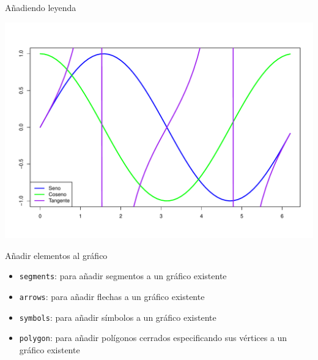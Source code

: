 \documentclass[
  ignorenonframetext,
  aspectratio=169]{beamer}
\providecommand{\tightlist}{%
  \setlength{\itemsep}{0pt}\setlength{\parskip}{0pt}}
\begin{document}
\begin{frame}{Añadiendo leyenda}
\protect\hypertarget{auxf1adiendo-leyenda-1}{}
\begin{center}\includegraphics[width=0.75\linewidth]{Hora2_files/figure-beamer/unnamed-chunk-18-1} \end{center}
\end{frame}

\begin{frame}[fragile]{Añadir elementos al gráfico}
\protect\hypertarget{auxf1adir-elementos-al-gruxe1fico-4}{}
\begin{itemize}
\tightlist
\item
  \texttt{segments}: para añadir segmentos a un gráfico existente
\item
  \texttt{arrows}: para añadir flechas a un gráfico existente
\item
  \texttt{symbols}: para añadir símbolos a un gráfico existente
\item
  \texttt{polygon}: para añadir polígonos cerrados especificando sus
  vértices a un gráfico existente
\end{itemize}
\end{frame}
\end{document}
